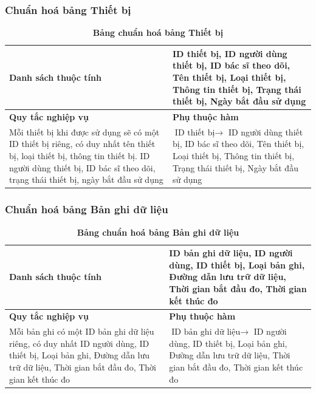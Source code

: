 \subsubsection{Chuẩn hoá bảng Thiết bị}
\mbox{}

\begin{table}[H]
  \caption{\bfseries \fontsize{12pt}{0pt}\selectfont Bảng chuẩn hoá bảng Thiết bị}
  \centering
  \begin{tabularx}{0.9\textwidth}{|X|X|}
    \hline
    \textbf{Danh sách thuộc tính} & ID thiết bị, ID người dùng thiết bị, ID bác sĩ theo dõi, Tên thiết bị, 
    Loại thiết bị, Thông tin thiết bị, Trạng thái thiết bị, Ngày bắt đầu sử dụng \\
    \hline
    \textbf{Quy tắc nghiệp vụ} & \textbf{Phụ thuộc hàm} \\
    \hline
    Mỗi thiết bị khi được sử dụng sẽ có một ID thiết bị riêng, có duy nhất tên thiết bị, loại thiết bị, thông tin thiết bị.
    ID người dùng thiết bị, ID bác sĩ theo dõi, trạng thái thiết bị, ngày bắt đầu sử dụng
    & \parbox[t]{\linewidth}{$\text{ID thiết bị} \rightarrow$ ID người dùng thiết bị, ID bác sĩ theo dõi, Tên thiết bị, 
    Loại thiết bị, Thông tin thiết bị, Trạng thái thiết bị, Ngày bắt đầu sử dụng} \\
    \hline
     \\
     \\
    \hline
  \end{tabularx}
\end{table}

\subsubsection{Chuẩn hoá bảng Bản ghi dữ liệu}
\mbox{}

\begin{table}[H]
  \caption{\bfseries \fontsize{12pt}{0pt}\selectfont Bảng chuẩn hoá bảng Bản ghi dữ liệu}
  \centering
  \begin{tabularx}{0.9\textwidth}{|X|X|}
    \hline
    \textbf{Danh sách thuộc tính} & ID bản ghi dữ liệu, ID người dùng, ID thiết bị, Loại bản ghi, 
    Đường dẫn lưu trữ dữ liệu, Thời gian bắt đầu đo, Thời gian kết thúc đo \\
    \hline
    \textbf{Quy tắc nghiệp vụ} & \textbf{Phụ thuộc hàm} \\
    \hline
    Mỗi bản ghi có một ID bản ghi dữ liệu riêng, có duy nhất ID người dùng, ID thiết bị, Loại bản ghi, 
    Đường dẫn lưu trữ dữ liệu, Thời gian bắt đầu đo, Thời gian kết thúc đo
    & \parbox[t]{\linewidth}{$\text{ID bản ghi dữ liệu} \rightarrow$ ID người dùng, ID thiết bị, Loại bản ghi, 
    Đường dẫn lưu trữ dữ liệu, Thời gian bắt đầu đo, Thời gian kết thúc đo} \\
    \hline
     \\
     \\
    \hline
  \end{tabularx}
\end{table}

